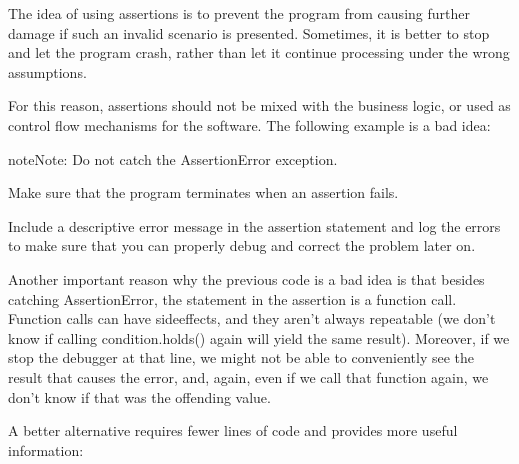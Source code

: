 \documentclass[a4paper,10pt,english]{sphinxmanual}
\begin{document}
The idea of using assertions is to prevent the program from causing further damage if such an invalid scenario
is presented. Sometimes, it is better to stop and let the program crash, rather than let it continue
processing under the wrong assumptions.

For this reason, assertions should not be mixed with the business logic, or used as control flow mechanisms
for the software. The following example is a bad idea:

\begin{sphinxVerbatim}[commandchars=\\\{\}]
      
 
\end{sphinxVerbatim}

\begin{sphinxadmonition}{note}{Note:}
Do not catch the AssertionError exception.
\end{sphinxadmonition}

Make sure that the program terminates when an assertion fails.

Include a descriptive error message in the assertion statement and log the errors to make sure that you can
properly debug and correct the problem later on.

Another important reason why the previous code is a bad idea is that besides catching AssertionError, the
statement in the assertion is a function call. Function calls can have side\sphinxhyphen{}effects, and they aren’t always
repeatable (we don’t know if calling condition.holds() again will yield the same result). Moreover, if we stop
the debugger at that line, we might not be able to conveniently see the result that causes the error, and,
again, even if we call that function again, we don’t know if that was the offending value.

A better alternative requires fewer lines of code and provides more useful information:

\begin{sphinxVerbatim}[commandchars=\\\{\}]
  
    
\end{sphinxVerbatim}
\end{document}
